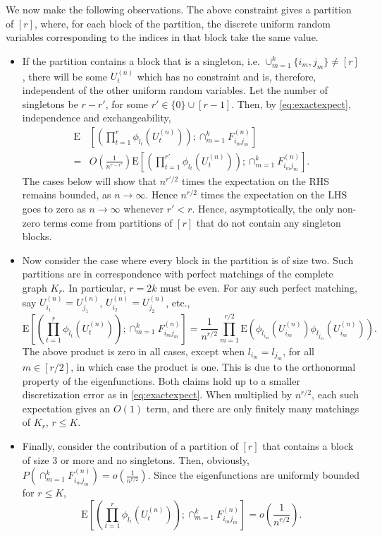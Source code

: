 \documentclass{amsart}
\newcommand{\E}{\mathrm{E}}
\begin{document}
We now make the following observations. The above constraint gives a partition of $[r]$, where, for each block of the partition, the discrete uniform random variables corresponding to the indices in that block take the same value. 

\begin{itemize}
    \item If the partition contains a block that is a singleton, i.e. $\cup_{m=1}^k \{i_m, j_m\} \neq [r]$, there will be some $U^{(n)}_t$ which has no constraint and is, therefore, independent of the other uniform random variables. Let the number of singletons be $r-r'$, for some $r' \in \{0\} \cup [r-1]$. Then, by \eqref{eq:exactexpect}, independence and exchangeability,  
    \[
    \begin{split}
    \E&\left[\left(\prod_{t=1}^r \phi_{l_t}(U^{(n)}_t)\right);  \cap_{m=1}^k F^{(n)}_{i_mj_m} \right]\\
    =&O\left(\frac{1}{n^{r-r'}}\right)  \E\left[\left(\prod_{t=1}^{r'} \phi_{l_t}(U^{(n)}_t)\right);  \cap_{m=1}^k F^{(n)}_{i_mj_m} \right].
    \end{split}
    \]
    The cases below will show that $n^{r'/2}$ times the expectation on the RHS remains bounded, as $n\rightarrow \infty$. Hence $n^{r/2}$ times the expectation on the LHS goes to zero as $n\rightarrow \infty$ whenever $r' < r$.  
    Hence, asymptotically, the only non-zero terms come from partitions of $[r]$ that do not contain any singleton blocks. 
    \item Now consider the case where every block in the partition is of size two. Such partitions are in correspondence with perfect matchings of the complete graph $K_r$. In particular, $r=2k$ must be even. For any such perfect matching, say $U^{(n)}_{i_1}=U^{(n)}_{j_1}$, $U^{(n)}_{i_2}=U^{(n)}_{j_2}$, etc., 
    \[
    \E\left[\left(\prod_{t=1}^r \phi_{l_t}(U^{(n)}_t)\right);  \cap_{m=1}^k F^{(n)}_{i_mj_m} \right]= \frac{1}{n^{r/2}}\prod_{m=1}^{r/2} \E\left( \phi_{l_{i_m}}(U^{(n)}_{i_m}) \phi_{l_{j_m}}(U^{(n)}_{i_m}) \right).
    \]
    The above product is zero in all cases, except when $l_{i_m}=l_{j_m}$, for all $m\in [r/2]$, in which case the product is one. This is due to the orthonormal property of the eigenfunctions. Both claims hold up to a smaller discretization error as in \eqref{eq:exactexpect}. When multiplied by $n^{r/2}$, each such expectation gives an $O(1)$ term, and there are only finitely many matchings of $K_r$, $r\le K$.  
    
    \item Finally, consider the contribution of a partition of $[r]$ that contains a block of size $3$ or more and no singletons. Then, obviously, $P\left( \cap_{m=1}^k F^{(n)}_{i_mj_m}\right)=o\left( \frac{1}{n^{r/2}}\right)$.
    Since the eigenfunctions are uniformly bounded for $r\le K$, 
    \[
    \E\left[\left(\prod_{t=1}^r \phi_{l_t}(U^{(n)}_t)\right);  \cap_{m=1}^k F^{(n)}_{i_mj_m} \right]=o\left( \frac{1}{n^{r/2}}\right).
    \]
\end{itemize}
\end{document}
